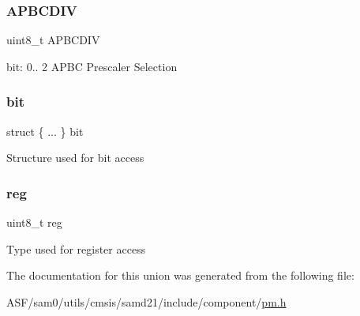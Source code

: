 \subsubsection{\texorpdfstring{APBCDIV}{APBCDIV}}
{\footnotesize\ttfamily uint8\+\_\+t A\+P\+B\+C\+D\+IV}

bit\+: 0.. 2 A\+P\+BC Prescaler Selection \mbox{\label{union_p_m___a_p_b_c_s_e_l___type_a9493cc559ccf6f636240276cf8468b45}} 
\subsubsection{\texorpdfstring{bit}{bit}}
{\footnotesize\ttfamily struct \{ ... \}   bit}

Structure used for bit access \mbox{\label{union_p_m___a_p_b_c_s_e_l___type_a9428adc9af4653a2050e2536b55dec8d}} 
\subsubsection{\texorpdfstring{reg}{reg}}
{\footnotesize\ttfamily uint8\+\_\+t reg}

Type used for register access 

The documentation for this union was generated from the following file\+:\begin{DoxyCompactItemize}
\item 
A\+S\+F/sam0/utils/cmsis/samd21/include/component/\mbox{\hyperlink{component_2pm_8h}{pm.\+h}}\end{DoxyCompactItemize}

